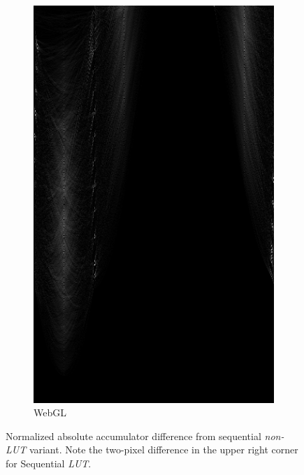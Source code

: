 \begin{figure}
\begin{subfigure}{0.29\textwidth}
        \includegraphics[width=\linewidth] {../../packages/js-benchmarks/img/diff_seq_gpu.png}
        \caption{WebGL}\label{fig:diff:gpu}
    \end{subfigure}
    \caption{Normalized absolute accumulator difference from sequential \textit{non-LUT} variant. Note the two-pixel difference in the upper right corner for Sequential \textit{LUT}.}\label{fig:diff}
\end{figure}
